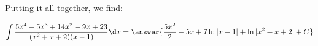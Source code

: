 \documentclass{ximera}
\begin{document}
\begin{exercise}
\begin{exercise}
\begin{exercise}
\begin{exercise}
\begin{exercise}
\begin{exercise}
Putting it all together, we find:

\[
\int \frac{5x^{4}-5x^{3}+14x^{2}-9x+23}{(x^{2}+x+2)(x-1)} \d x= \answer{ \frac{5x^{2}}{2} - 5x+7\ln|x-1|+ \ln| x^{2}+x+2 | + C}
\]


\end{exercise}
\end{exercise}
\end{exercise}
\end{exercise}
\end{exercise}
\end{exercise}
\end{document}
